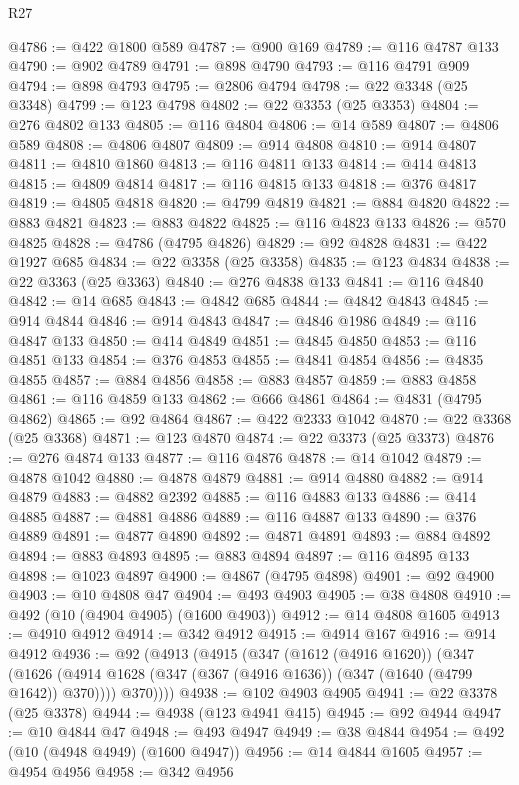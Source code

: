 \begin{lexlean}{R27}
\begin{coremodule}
@4786 := @422 @1800 @589
@4787 := @900 @169
@4789 := @116 @4787 @133
@4790 := @902 @4789
@4791 := @898 @4790
@4793 := @116 @4791 @909
@4794 := @898 @4793
@4795 := @2806 @4794
@4798 := @22 @3348 (@25 @3348)
@4799 := @123 @4798
@4802 := @22 @3353 (@25 @3353)
@4804 := @276 @4802 @133
@4805 := @116 @4804
@4806 := @14 @589
@4807 := @4806 @589
@4808 := @4806 @4807
@4809 := @914 @4808
@4810 := @914 @4807
@4811 := @4810 @1860
@4813 := @116 @4811 @133
@4814 := @414 @4813
@4815 := @4809 @4814
@4817 := @116 @4815 @133
@4818 := @376 @4817
@4819 := @4805 @4818
@4820 := @4799 @4819
@4821 := @884 @4820
@4822 := @883 @4821
@4823 := @883 @4822
@4825 := @116 @4823 @133
@4826 := @570 @4825
@4828 := @4786 (@4795 @4826)
@4829 := @92 @4828
@4831 := @422 @1927 @685
@4834 := @22 @3358 (@25 @3358)
@4835 := @123 @4834
@4838 := @22 @3363 (@25 @3363)
@4840 := @276 @4838 @133
@4841 := @116 @4840
@4842 := @14 @685
@4843 := @4842 @685
@4844 := @4842 @4843
@4845 := @914 @4844
@4846 := @914 @4843
@4847 := @4846 @1986
@4849 := @116 @4847 @133
@4850 := @414 @4849
@4851 := @4845 @4850
@4853 := @116 @4851 @133
@4854 := @376 @4853
@4855 := @4841 @4854
@4856 := @4835 @4855
@4857 := @884 @4856
@4858 := @883 @4857
@4859 := @883 @4858
@4861 := @116 @4859 @133
@4862 := @666 @4861
@4864 := @4831 (@4795 @4862)
@4865 := @92 @4864
@4867 := @422 @2333 @1042
@4870 := @22 @3368 (@25 @3368)
@4871 := @123 @4870
@4874 := @22 @3373 (@25 @3373)
@4876 := @276 @4874 @133
@4877 := @116 @4876
@4878 := @14 @1042
@4879 := @4878 @1042
@4880 := @4878 @4879
@4881 := @914 @4880
@4882 := @914 @4879
@4883 := @4882 @2392
@4885 := @116 @4883 @133
@4886 := @414 @4885
@4887 := @4881 @4886
@4889 := @116 @4887 @133
@4890 := @376 @4889
@4891 := @4877 @4890
@4892 := @4871 @4891
@4893 := @884 @4892
@4894 := @883 @4893
@4895 := @883 @4894
@4897 := @116 @4895 @133
@4898 := @1023 @4897
@4900 := @4867 (@4795 @4898)
@4901 := @92 @4900
@4903 := @10 @4808 @47
@4904 := @493 @4903
@4905 := @38 @4808
@4910 := @492 (@10 (@4904 @4905) (@1600 @4903))
@4912 := @14 @4808 @1605
@4913 := @4910 @4912
@4914 := @342 @4912
@4915 := @4914 @167
@4916 := @914 @4912
@4936 := @92
    (@4913
      (@4915
        (@347
          (@1612 (@4916 @1620))
          (@347
            (@1626 (@4914 @1628 (@347 (@367 (@4916 @1636)) (@347 (@1640 (@4799 @1642)) @370))))
            @370))))
@4938 := @102 @4903 @4905
@4941 := @22 @3378 (@25 @3378)
@4944 := @4938 (@123 @4941 @415)
@4945 := @92 @4944
@4947 := @10 @4844 @47
@4948 := @493 @4947
@4949 := @38 @4844
@4954 := @492 (@10 (@4948 @4949) (@1600 @4947))
@4956 := @14 @4844 @1605
@4957 := @4954 @4956
@4958 := @342 @4956

\end{coremodule}
\end{lexlean}

